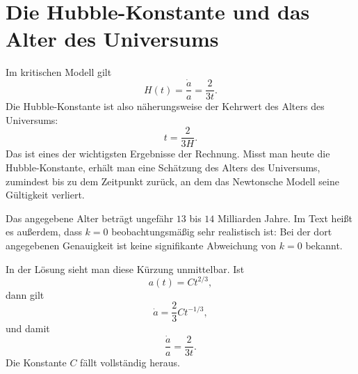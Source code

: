 \section{Die Hubble-Konstante und das Alter des Universums}

Im kritischen Modell gilt
\begin{equation}
H(t)=\frac{\dot a}{a}=\frac{2}{3t}.
\end{equation}
Die Hubble-Konstante ist also näherungsweise der Kehrwert des Alters des Universums:
\begin{equation}
t=\frac{2}{3H}.
\end{equation}
Das ist eines der wichtigsten Ergebnisse der Rechnung. Misst man heute die Hubble-Konstante, erhält man eine Schätzung des Alters des Universums, zumindest bis zu dem Zeitpunkt zurück, an dem das Newtonsche Modell seine Gültigkeit verliert.

Das angegebene Alter beträgt ungefähr \(13\) bis \(14\) Milliarden Jahre. Im Text heißt es außerdem, dass \(k=0\) beobachtungsmäßig sehr realistisch ist: Bei der dort angegebenen Genauigkeit ist keine signifikante Abweichung von \(k=0\) bekannt.

\begin{classroomqa}
\end{classroomqa}

In der Lösung sieht man diese Kürzung unmittelbar. Ist
\begin{equation}
a(t)=Ct^{2/3},
\end{equation}
dann gilt
\begin{equation}
\dot a=\frac{2}{3}Ct^{-1/3},
\end{equation}
und damit
\begin{equation}
\frac{\dot a}{a}=\frac{2}{3t}.
\end{equation}
Die Konstante \(C\) fällt vollständig heraus.

